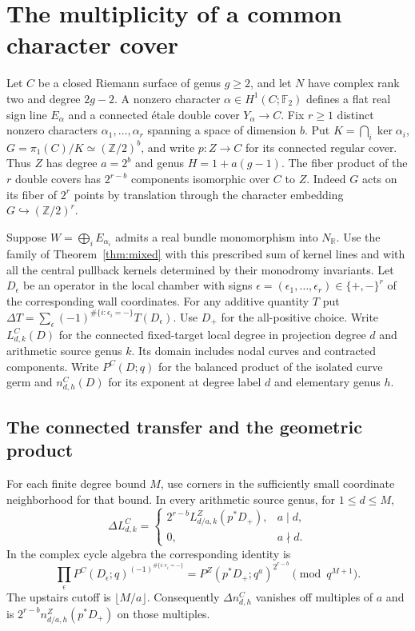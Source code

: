 \section{The multiplicity of a common character cover}\label{sec:characters}
Let \(C\) be a closed Riemann surface of genus \(g\ge2\), and let \(N\) have complex rank two and degree \(2g-2\). A nonzero character \(\alpha\in H^1(C;\mathbb F_2)\) defines a flat real sign line \(E_\alpha\) and a connected étale double cover \(Y_\alpha\to C\). Fix \(r\ge1\) distinct nonzero characters \(\alpha_1,\ldots,\alpha_r\) spanning a space of dimension \(b\). Put \(K=\bigcap_i\ker\alpha_i\), \(G=\pi_1(C)/K\simeq(\mathbb Z/2)^b\), and write \(p:Z\to C\) for its connected regular cover. Thus \(Z\) has degree \(a=2^b\) and genus \(H=1+a(g-1)\). The fiber product of the \(r\) double covers has \(2^{r-b}\) components isomorphic over \(C\) to \(Z\). Indeed \(G\) acts on its fiber of \(2^r\) points by translation through the character embedding \(G\hookrightarrow(\mathbb Z/2)^r\).

Suppose \(W=\bigoplus_i E_{\alpha_i}\) admits a real bundle monomorphism into \(N_{\mathbb R}\). Use the family of Theorem~\ref{thm:mixed} with this prescribed sum of kernel lines and with all the central pullback kernels determined by their monodromy invariants. Let \(D_\epsilon\) be an operator in the local chamber with signs \(\epsilon=(\epsilon_1,\ldots,\epsilon_r)\in\{+,-\}^r\) of the corresponding wall coordinates. For any additive quantity \(T\) put \(\Delta T=\sum_\epsilon(-1)^{\#\{i:\epsilon_i=-\}}T(D_\epsilon)\). Use \(D_+\) for the all-positive choice. Write \(L^C_{d,k}(D)\) for the connected fixed-target local degree in projection degree \(d\) and arithmetic source genus \(k\). Its domain includes nodal curves and contracted components. Write \(P^C(D;q)\) for the balanced product of the isolated curve germ and \(n^C_{d,h}(D)\) for its exponent at degree label \(d\) and elementary genus \(h\).

\subsection{The connected transfer and the geometric product}

For each finite degree bound \(M\), use corners in the sufficiently small coordinate neighborhood for that bound. In every arithmetic source genus, for \(1\le d\le M\),
\[\Delta L^C_{d,k}=
 \begin{cases}
    2^{r-b} L^Z_{d/a,k}(p^*D_+),&a\mid d,\\
    0,&a\nmid d .
 \end{cases}\]
In the complex cycle algebra the corresponding identity is
\[\prod_{\epsilon} P^C(D_\epsilon;q)^{(-1)^{\#\{i:\epsilon_i=-\}}}
   =P^Z(p^*D_+;q^a)^{2^{r-b}}\pmod {q^{M+1}} .\]
The upstairs cutoff is \(\lfloor M/a\rfloor\). Consequently \(\Delta n^C_{d,h}\) vanishes off multiples of \(a\) and is \(2^{r-b} n^Z_{d/a,h}(p^*D_+)\) on those multiples.

